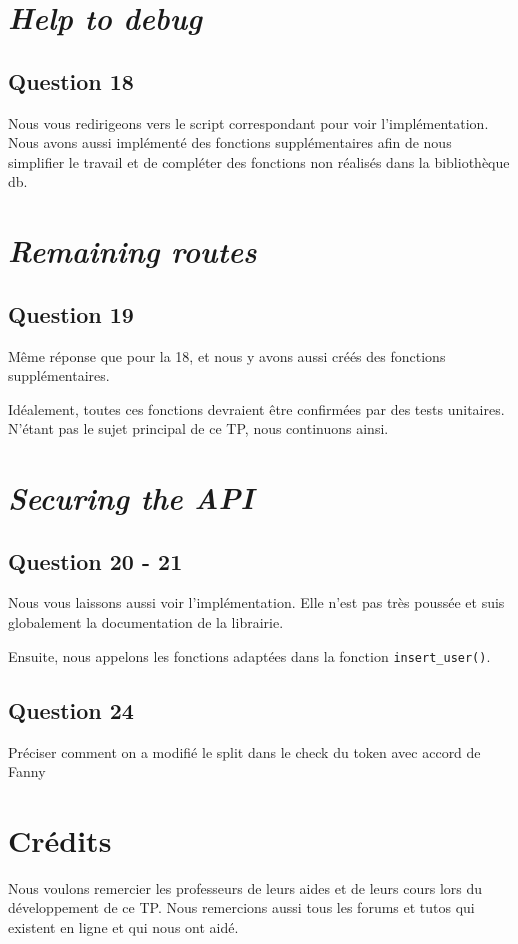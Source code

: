 \documentclass{ceri/sty/rapport}
\begin{document}
\section{\textit{Help to debug}}
\subsection{Question 18}
Nous vous redirigeons vers le script correspondant pour voir l'implémentation.
Nous avons aussi implémenté des fonctions supplémentaires afin de nous simplifier le travail et de compléter des fonctions non réalisés dans la bibliothèque db.

\section{\textit{Remaining routes}}
\subsection{Question 19}
Même réponse que pour la 18, et nous y avons aussi créés des fonctions supplémentaires.

Idéalement, toutes ces fonctions devraient être confirmées par des tests unitaires.
N'étant pas le sujet principal de ce TP, nous continuons ainsi.

\section{\textit{Securing the API}}
\subsection{Question 20 - 21}
Nous vous laissons aussi voir l'implémentation. 
Elle n'est pas très poussée et suis globalement la documentation de la librairie.

Ensuite, nous appelons les fonctions adaptées dans la fonction \texttt{insert\_user()}.


\subsection{Question 24}
Préciser comment on a modifié le split dans le check du token avec accord de Fanny

\section{Crédits}
Nous voulons remercier les professeurs de leurs aides et de leurs cours lors du développement de ce TP.
Nous remercions aussi tous les forums et tutos qui existent en ligne et qui nous ont aidé.
\end{document}
